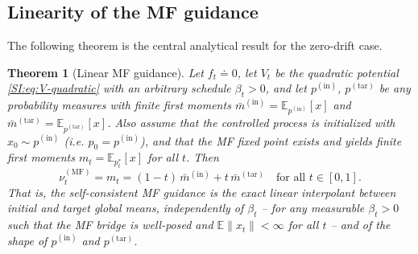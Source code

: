 \documentclass[11pt,onecolumn]{article}
\newcommand{\ptar}{p^{(\mathrm{tar})}}
\newcommand{\pin}{p^{(\mathrm{in})}}
\newcommand{\MF}{\mathrm{MF}}
\newtheorem{theorem}{Theorem}[section]
\begin{document}
\subsection{Linearity of the MF guidance}
\label{SI:quad:linear}

The following theorem is the central analytical result for the
zero-drift case.

\begin{theorem}[Linear MF guidance]
\label{thm:linear-guidance}
Let $f_t \doteq  0$, let $V_t$ be the quadratic potential \eqref{SI:eq:V-quadratic} with an arbitrary schedule $\beta_t > 0$, and let $\pin$, $\ptar$ be any probability measures with finite first moments $\bar m^{(\mathrm{in})} = \mathbb{E}_{\pin}[x]$ and $\bar m^{(\mathrm{tar})} = \mathbb{E}_{\ptar}[x]$. Also assume that the controlled process is initialized with $x_0\sim p^{(\mathrm{in})}$ (i.e. $p_0=p^{(\mathrm{in})}$), and that the MF fixed point exists and yields finite first moments  $m_t = \mathbb{E}_{p_t^*}[x]$ for all $t$. Then
\begin{equation}
  \nu_t^{(\MF)} = m_t
  = (1-t)\,\bar m^{(\mathrm{in})} + t\,\bar m^{(\mathrm{tar})}
  \quad \text{for all } t\in[0,1].
  \label{SI:eq:nu-linear}
\end{equation}
That is, the self-consistent MF guidance is the \emph{exact} linear interpolant between initial and target global means, independently of $\beta_t$ -- for any measurable $\beta_t>0$ such that the MF bridge is well-posed and $\mathbb E\|x_t\|<\infty$ for all $t$ -- and of the shape of $\pin$ and $\ptar$.
\end{theorem}
\end{document}
